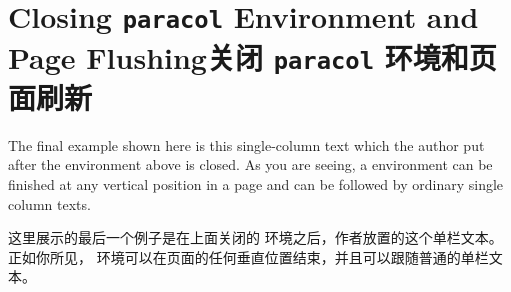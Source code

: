 \section{Closing \texttt{paracol} Environment and Page Flushing\hfill 关闭 \texttt{paracol} 环境和页面刷新}
\label{sec:man-close}

The final example shown here is this single-column text which the author put
after the  environment above is closed.  As you are seeing, a
 environment can be finished at any vertical position in a
page and can be followed by ordinary single column texts.


这里展示的最后一个例子是在上面关闭的 环境之后，作者放置的这个单栏文本。正如你所见， 环境可以在页面的任何垂直位置结束，并且可以跟随普通的单栏文本。

